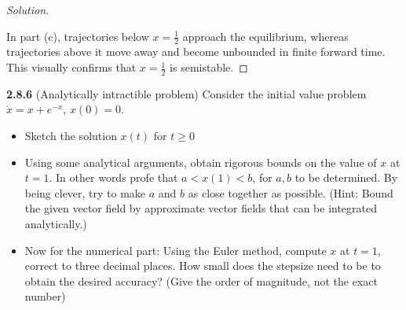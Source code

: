 \documentclass[10pt]{amsart}
\newenvironment{solution}
{\begin{proof}[Solution]}
{\end{proof}}
\newcommand{\slopeelement}[3]{%
    \pgfmathsetmacro{\slopeDX}{0.14/sqrt(1+(#3)^2)}%
    \pgfmathsetmacro{\slopeDY}{(#3)*\slopeDX}%
    \pgfmathsetmacro{\slopeXA}{(#1)-\slopeDX}%
    \pgfmathsetmacro{\slopeYA}{(#2)-\slopeDY}%
    \pgfmathsetmacro{\slopeXB}{(#1)+\slopeDX}%
    \pgfmathsetmacro{\slopeYB}{(#2)+\slopeDY}%
    \edef\slopecommand{%
        \noexpand\draw[gray,thin]
        (axis cs:\slopeXA,\slopeYA)
        --
        (axis cs:\slopeXB,\slopeYB);%
    }%
    \slopecommand
}
\begin{document}
\begin{onehalfspace}
\begin{solution}
\begin{center}
            \end{center}

            In part (c), trajectories below $x=\tfrac12$ approach the equilibrium,
            whereas trajectories above it move away and become unbounded in finite
            forward time. This visually confirms that $x=\tfrac12$ is semistable.
        \end{solution}

        \noindent\textbf{2.8.6} (Analytically intractible problem) Consider the initial value
        problem $\dot{x} = x + e^{-x}$, $x(0) = 0$.
        \begin{itemize}
            \item[(a)] Sketch the solution $x(t)$ for $t\ge 0$
            \item[(b)] Using some analytical arguments, obtain rigorous bounds on the value of $x$ at
            $t=1$.
            In other words profe that $a < x(1) < b$, for $a,b$ to be determined.
            By being clever, try to make $a$ and $b$ as close together as possible.
            (Hint: Bound the given vector field by approximate vector fields that can be integrated
            analytically.)
            \item[(c)] Now for the numerical part: Using the Euler method, compute $x$ at $t=1$, correct
            to three decimal places.
            How small does the stepsize need to be to obtain the desired accuracy?
            (Give the order of magnitude, not the exact number)
        \end{itemize}


\end{onehalfspace}
\end{document}
